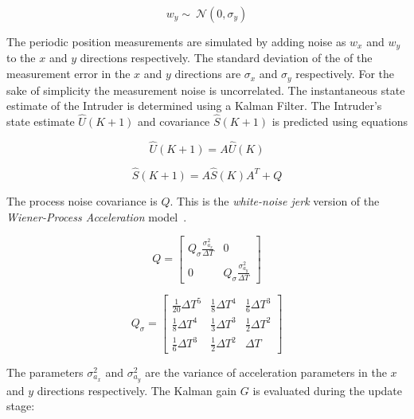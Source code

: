 \documentclass[journal]{IEEEtran}
\begin{document}
\begin{equation}
w_{y} \sim{~} \mathcal{N}(0,\sigma_{y})
\label{eq:noise_y}
\end{equation}

\noindent The periodic position measurements are simulated by adding noise as $w_{x}$ and $w_{y}$ to the $x$ and $y$ directions respectively. The standard deviation of the of the measurement error in the $x$ and $y$ directions are $\sigma_{x}$ and $\sigma_{y}$ respectively. For the sake of simplicity the measurement noise is uncorrelated. The instantaneous state estimate of the Intruder is determined using a Kalman Filter. The Intruder's state estimate $\hat{U}(K+1)$ and covariance $\hat{S}(K+1)$ is predicted using equations

\begin{equation}
\hat{U}(K+1) = A\hat{U}(K)
\label{eq:kalman_dyn}
\end{equation}

\begin{equation}
\hat{S}(K+1) = A\hat{S}(K)A^{T} + Q
\label{eq:kalman_error_predict}
\end{equation}

\noindent The process noise covariance is $Q$. This is the \textit{white-noise jerk} version of the \textit{Wiener-Process Acceleration} model~\cite{RongLi2003}.

\begin{equation}
	Q = \begin{bmatrix}		
			 Q_{\sigma}\frac{\sigma_{a_{x}}^{2}}{\Delta T} & 0 \\
			 0 & Q_{\sigma}\frac{\sigma_{a_{y}}^{2}}{\Delta T}
		\end{bmatrix}
\end{equation}

\begin{equation}
	Q_{\sigma} = \begin{bmatrix}
	\frac{1}{20}\Delta T^{5} & \frac{1}{8}\Delta T^{4} & \frac{1}{6}\Delta T^{3} \\	
	\frac{1}{8}\Delta T^{4} & \frac{1}{3}\Delta T^{3} & \frac{1}{2}\Delta T^{2} \\	
	\frac{1}{6}\Delta T^{3} & \frac{1}{2}\Delta T^{2} & \Delta T
	\end{bmatrix} 
\end{equation}

\noindent The parameters $\sigma_{a_{x}}^{2}$ and $\sigma_{a_{y}}^{2}$ are the variance of acceleration parameters in the $x$ and $y$ directions respectively. The Kalman gain $G$ is evaluated during the update stage:
\end{document}
